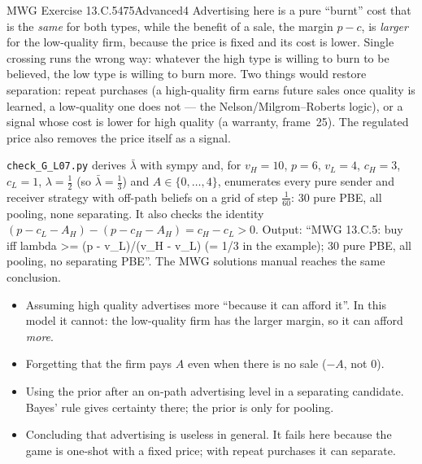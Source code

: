 \begin{exsol}{MWG Exercise 13.C.5}{475}{Advanced}{4}
\interp Advertising here is a pure ``burnt'' cost that is the \emph{same} for both types, while the benefit of a
sale, the margin $p - c$, is \emph{larger} for the low-quality firm, because the price is fixed and its cost is
lower. Single crossing runs the wrong way: whatever the high type is willing to burn to be believed, the low
type is willing to burn more. Two things would restore separation: repeat purchases (a high-quality firm earns
future sales once quality is learned, a low-quality one does not --- the Nelson/Milgrom--Roberts logic), or a
signal whose cost is lower for high quality (a warranty, frame~25). The regulated price also removes the
price itself as a signal.

\verify \texttt{check\_G\_L07.py} derives $\bar\lambda$ with sympy and, for $v_H = 10$, $p = 6$, $v_L = 4$,
$c_H = 3$, $c_L = 1$, $\lambda = \frac12$ (so $\bar\lambda = \frac13$) and $A \in \{0, \dots, 4\}$, enumerates every
pure sender and receiver strategy with off-path beliefs on a grid of step $\frac1{60}$: $30$ pure PBE, all pooling,
none separating. It also checks the identity $(p - c_L - A_H) - (p - c_H - A_H) = c_H - c_L > 0$. Output: ``MWG
13.C.5: buy iff lambda >= (p - v\_L)/(v\_H - v\_L) (= 1/3 in the example); 30 pure PBE, all pooling, no separating
PBE''. The MWG solutions manual reaches the same conclusion.

\mistakes
\begin{itemize}
  \item Assuming high quality advertises more ``because it can afford it''. In this model it cannot: the
  low-quality firm has the larger margin, so it can afford \emph{more}.
  \item Forgetting that the firm pays $A$ even when there is no sale ($-A$, not $0$).
  \item Using the prior after an on-path advertising level in a separating candidate. Bayes' rule gives
  certainty there; the prior is only for pooling.
  \item Concluding that advertising is useless in general. It fails here because the game is one-shot with a
  fixed price; with repeat purchases it can separate.
\end{itemize}

\end{exsol}
